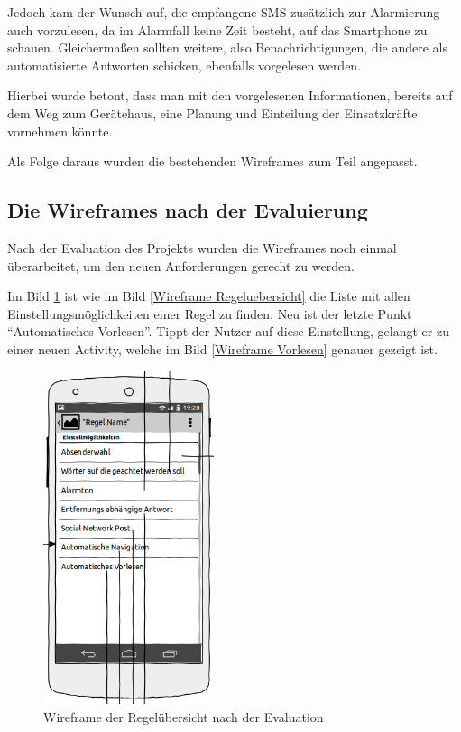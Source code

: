 Jedoch kam der Wunsch auf, die empfangene SMS zus\"atzlich zur Alarmierung auch vorzulesen, da im Alarmfall keine Zeit besteht, auf das Smartphone zu schauen. Gleicherma\ss{}en sollten weitere, also Benachrichtigungen, die andere als automatisierte Antworten schicken, ebenfalls vorgelesen werden.

Hierbei wurde betont, dass man mit den vorgelesenen Informationen, bereits auf dem Weg zum Ger\"atehaus, eine Planung und Einteilung der Einsatzkr\"afte vornehmen k\"onnte.

Als Folge daraus wurden die bestehenden Wireframes zum Teil angepasst.

\subsection{Die Wireframes nach der Evaluierung}
Nach der Evaluation des Projekts wurden die Wireframes noch einmal \"uberarbeitet, um den neuen Anforderungen gerecht zu werden.

Im Bild \ref{Wireframe Regeluebersicht nach Eval} ist wie im Bild \ref{Wireframe Regeluebersicht} die Liste mit allen Einstellungsm\"oglichkeiten einer Regel zu finden. Neu ist der letzte Punkt "`Automatisches Vorlesen"'. Tippt der Nutzer auf diese Einstellung, gelangt er zu einer neuen Activity, welche im Bild \ref{Wireframe Vorlesen} genauer gezeigt ist.
\begin{figure}[!ht]
\centering
\includegraphics[width=5cm]{Bilder/WireFrame_RegelauswahlNachEvaluation.png}
\caption{Wireframe der Regel\"ubersicht nach der Evaluation}
\label{Wireframe Regeluebersicht nach Eval}
\centering
\end{figure}

